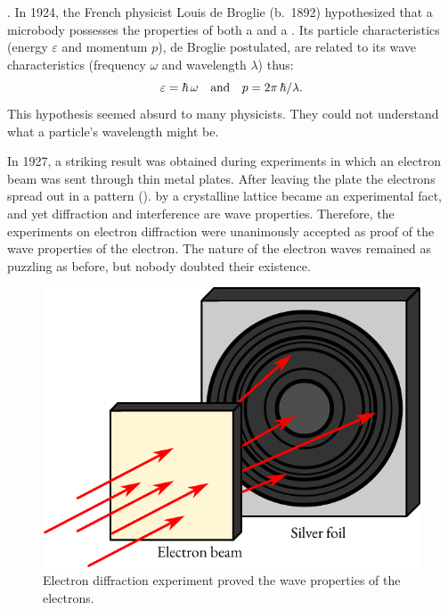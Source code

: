 . In
1924, the French physicist Louis de Broglie (b.~1892) hypothesized that
a microbody possesses the properties of both a  and a . Its particle characteristics (energy $\varepsilon$ and momentum $p$), de Broglie postulated, are related to its wave characteristics (frequency $\omega$ and wavelength $\lambda$) thus:
\begin{equation}%
\varepsilon = \hbar \, \omega \qand p = 2 \pi \, \hbar / \lambda.
\label{eq-5.4}
\end{equation}
This hypothesis seemed absurd to many physicists. They could not
understand what a particle's wavelength might be.

In 1927, a striking result was obtained during experiments in which
an electron beam was sent through thin metal plates. After leaving the
plate the electrons spread out in a  pattern ().  by a crystalline lattice became an experimental fact, and yet diffraction and interference are wave properties. Therefore, the experiments on electron diffraction were unanimously accepted as proof of the wave properties of the electron. The nature of the electron waves remained as puzzling as before, but nobody doubted their existence.

\begin{figure}[!ht]
\centering
\includegraphics[width=0.75\tfwidth]{figures/diffraction-01.pdf}
\caption{ Electron diffraction experiment proved the wave properties of the electrons.\label{diffraction1}}
\end{figure}

